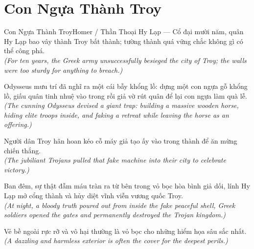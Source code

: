 \section{Con Ngựa Thành Troy}
\begin{truyen}{Con Ngựa Thành Troy}{Homer / Thần Thoại Hy Lạp --- Cổ đại}
 mười năm, quân Hy Lạp bao vây thành Troy bất thành; tường thành quá vững chắc không gì có thể công phá.\\[4pt]
\textit{(For ten years, the Greek army unsuccessfully besieged the city of Troy; the walls were too sturdy for anything to breach.)}

Odysseus mưu trí đã nghĩ ra một cái bẫy khổng lồ: dựng một con ngựa gỗ khổng lồ, giấu quân tinh nhuệ vào trong rồi giả vờ rút quân để lại con ngựa làm quà lễ.\\[4pt]
\textit{(The cunning Odysseus devised a giant trap: building a massive wooden horse, hiding elite troops inside, and faking a retreat while leaving the horse as an offering.)}

Người dân Troy hân hoan kéo cỗ máy giả tạo ấy vào trong thành để ăn mừng chiến thắng.\\[4pt]
\textit{(The jubiliant Trojans pulled that fake machine into their city to celebrate victory.)}

Ban đêm, sự thật đẫm máu tràn ra từ bên trong vỏ bọc hòa bình giả dối, lính Hy Lạp mở cổng thành và hủy diệt vĩnh viễn vương quốc Troy.\\[4pt]
\textit{(At night, a bloody truth poured out from inside the fake peaceful shell, Greek soldiers opened the gates and permanently destroyed the Trojan kingdom.)}

\end{truyen}
\begin{baihoc}
  Vẻ bề ngoài rực rỡ và vô hại thường là vỏ bọc cho những hiểm họa sâu sắc nhất.\\[4pt]
  \textit{(A dazzling and harmless exterior is often the cover for the deepest perils.)}
\end{baihoc}

